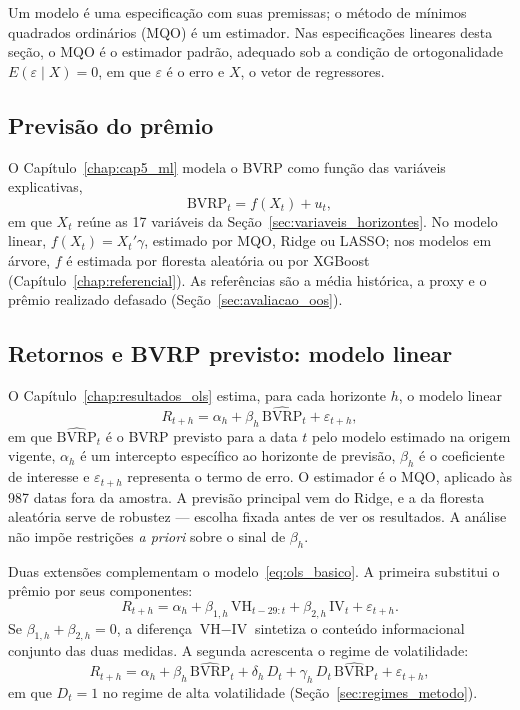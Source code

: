 Um modelo é uma especificação com suas premissas; o método de mínimos
quadrados ordinários (MQO) é um estimador. Nas especificações lineares desta
seção, o MQO é o estimador padrão, adequado sob a condição de ortogonalidade
$E(\varepsilon \mid X) = 0$, em que $\varepsilon$ é o erro e $X$, o vetor de
regressores.

\subsection{Previsão do prêmio}

O Capítulo~\ref{chap:cap5_ml} modela o BVRP como função das variáveis
explicativas,
\begin{equation}
\text{BVRP}_t = f(X_t) + u_t,
\label{eq:previsao_bvrp}
\end{equation}
em que $X_t$ reúne as 17 variáveis da Seção~\ref{sec:variaveis_horizontes}. No
modelo linear, $f(X_t) = X_t'\gamma$, estimado por MQO, Ridge ou LASSO; nos
modelos em árvore, $f$ é estimada por floresta aleatória ou por XGBoost
(Capítulo~\ref{chap:referencial}). As referências são a média histórica, a
proxy e o prêmio realizado defasado (Seção~\ref{sec:avaliacao_oos}).

\subsection{Retornos e BVRP previsto: modelo linear}

O Capítulo~\ref{chap:resultados_ols} estima, para cada horizonte $h$, o modelo
linear
\begin{equation}
R_{t+h} = \alpha_h + \beta_h \, \widehat{\text{BVRP}}_t + \varepsilon_{t+h},
\label{eq:ols_basico}
\end{equation}
em que $\widehat{\text{BVRP}}_t$ é o BVRP previsto para a data $t$ pelo modelo
estimado na origem vigente, $\alpha_h$ é um intercepto específico ao horizonte
de previsão, $\beta_h$ é o coeficiente de interesse e $\varepsilon_{t+h}$
representa o termo de erro. O estimador é o MQO, aplicado às 987 datas fora da
amostra. A previsão principal vem do Ridge, e a da floresta aleatória serve de
robustez --- escolha fixada antes de ver os resultados. A análise não impõe
restrições \textit{a priori} sobre o sinal de $\beta_h$.

Duas extensões complementam o modelo~\eqref{eq:ols_basico}. A primeira
substitui o prêmio por seus componentes:
\begin{equation}
R_{t+h} = \alpha_h + \beta_{1,h} \, \text{VH}_{t-29:t} + \beta_{2,h} \,
\text{IV}_t + \varepsilon_{t+h}.
\label{eq:ols_controles}
\end{equation}
Se $\beta_{1,h} + \beta_{2,h} = 0$, a diferença $\text{VH} - \text{IV}$
sintetiza o conteúdo informacional conjunto das duas medidas. A segunda
acrescenta o regime de volatilidade:
\begin{equation}
R_{t+h} = \alpha_h + \beta_h \, \widehat{\text{BVRP}}_t + \delta_h \, D_t
+ \gamma_h \, D_t \, \widehat{\text{BVRP}}_t + \varepsilon_{t+h},
\label{eq:ols_regime}
\end{equation}
em que $D_t = 1$ no regime de alta volatilidade
(Seção~\ref{sec:regimes_metodo}).

